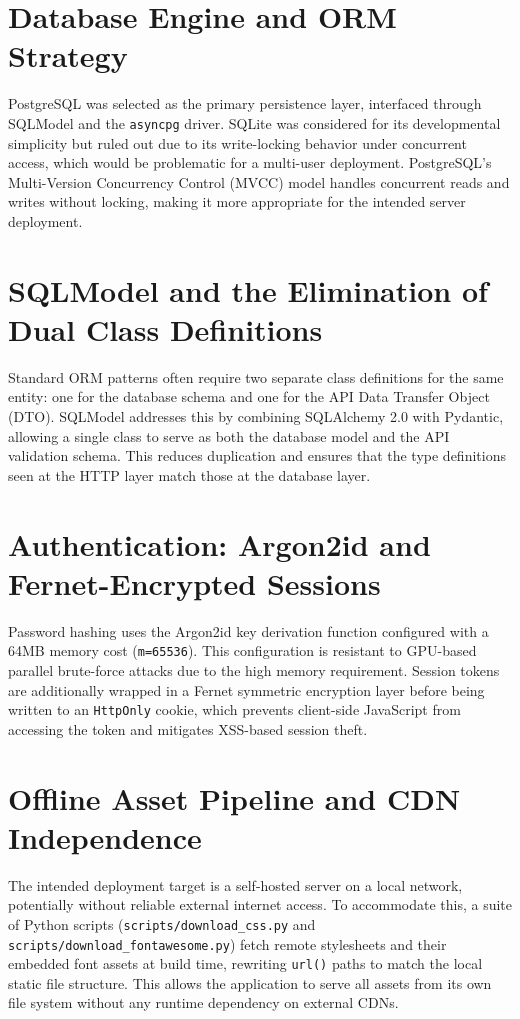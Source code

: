 \documentclass[11pt,a4paper]{book}
\begin{document}
\section{Database Engine and ORM Strategy}

PostgreSQL was selected as the primary persistence layer, interfaced through SQLModel and the \texttt{asyncpg} driver. SQLite was considered for its developmental simplicity but ruled out due to its write-locking behavior under concurrent access, which would be problematic for a multi-user deployment. PostgreSQL's Multi-Version Concurrency Control (MVCC) model handles concurrent reads and writes without locking, making it more appropriate for the intended server deployment.

\section{SQLModel and the Elimination of Dual Class Definitions}

Standard ORM patterns often require two separate class definitions for the same entity: one for the database schema and one for the API Data Transfer Object (DTO). SQLModel addresses this by combining SQLAlchemy 2.0 with Pydantic, allowing a single class to serve as both the database model and the API validation schema. This reduces duplication and ensures that the type definitions seen at the HTTP layer match those at the database layer.

\section{Authentication: Argon2id and Fernet-Encrypted Sessions}

Password hashing uses the Argon2id key derivation function configured with a 64MB memory cost (\texttt{m=65536}). This configuration is resistant to GPU-based parallel brute-force attacks due to the high memory requirement. Session tokens are additionally wrapped in a Fernet symmetric encryption layer before being written to an \texttt{HttpOnly} cookie, which prevents client-side JavaScript from accessing the token and mitigates XSS-based session theft.

\section{Offline Asset Pipeline and CDN Independence}

The intended deployment target is a self-hosted server on a local network, potentially without reliable external internet access. To accommodate this, a suite of Python scripts (\texttt{scripts/download\_css.py} and \texttt{scripts/download\_fontawesome.py}) fetch remote stylesheets and their embedded font assets at build time, rewriting \texttt{url()} paths to match the local static file structure. This allows the application to serve all assets from its own file system without any runtime dependency on external CDNs.
\end{document}
